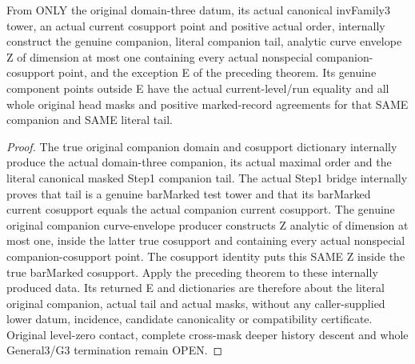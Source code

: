 \begin{theorem}
\label{hir:member-head-incidence-original-general-three-consumer}
\leanok
{}
From ONLY the original domain-three datum, its actual canonical invFamily3
tower, an actual current cosupport point and positive actual order, internally
construct the genuine companion, literal companion tail, analytic curve
envelope Z of dimension at most one containing every actual nonspecial
companion-cosupport point, and the exception E of the preceding theorem.
Its genuine component points outside E have the actual current-level/run
equality and all whole original head masks and positive marked-record
agreements for that SAME companion and SAME literal tail.
\end{theorem}
\begin{proof}
The true original companion domain and cosupport dictionary internally
produce the actual domain-three companion, its actual maximal order and
the literal canonical masked Step1 companion tail. The actual Step1 bridge
internally proves that tail is a genuine barMarked test tower and that its
barMarked current cosupport equals the actual companion current cosupport.
The genuine original companion curve-envelope producer constructs Z
analytic of dimension at most one, inside the latter true cosupport and
containing every actual nonspecial companion-cosupport point. The cosupport
identity puts this SAME Z inside the true barMarked cosupport. Apply the
preceding theorem to these internally produced data. Its returned E and
dictionaries are therefore about the literal original companion, actual
tail and actual masks, without any caller-supplied lower datum, incidence,
candidate canonicality or compatibility certificate. Original level-zero
contact, complete cross-mask deeper history descent and whole General3/G3
termination remain OPEN.
\end{proof}
